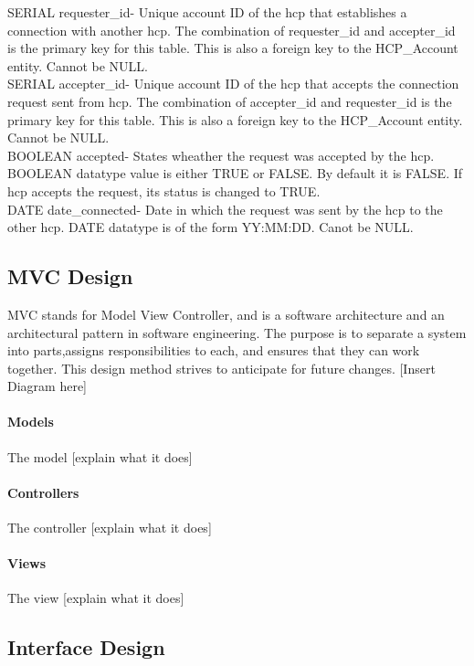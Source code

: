 \documentclass[12pt]{report}
\begin{document}
SERIAL requester_id- Unique account ID of the hcp that establishes a connection with another hcp.  The combination of requester_id and accepter_id is the primary key for this table.  This is also a foreign key to the HCP_Account entity.  Cannot be NULL.\\  

SERIAL accepter_id- Unique account ID of the hcp that accepts the connection request sent from hcp.  The combination of accepter_id and requester_id is the primary key for this table.  This is also a foreign key to the HCP_Account entity.  Cannot be NULL.\\

BOOLEAN accepted- States wheather the request was accepted by the hcp.  BOOLEAN datatype value is either TRUE or FALSE.  By default it is FALSE.  If hcp accepts the request, its status is changed to TRUE.\\

DATE date_connected- Date in which the request was sent by the hcp to the other hcp.  DATE datatype is of the form YY:MM:DD.  Canot be NULL.\\



\subsection{MVC Design}

MVC stands for Model View Controller, and is a software architecture and an architectural pattern in software engineering. The purpose is to separate a system into parts,assigns responsibilities to each, and ensures that they can work together. This design method strives to anticipate for future changes.
[Insert Diagram here]
\paragraph{Models}
The model [explain what it does]

\paragraph{Controllers}
The controller [explain what it does]

\paragraph{Views}
The view [explain what it does]

\subsection{Interface Design}
\end{document}
